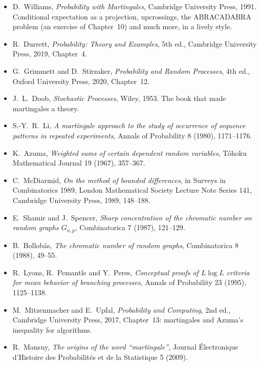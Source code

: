 \begin{itemize}
\item D.~Williams, \emph{Probability with Martingales}, Cambridge University Press, 1991. Conditional expectation as a
projection, upcrossings, the ABRACADABRA problem (an exercise of Chapter~10) and much more, in a lively style.
\item R.~Durrett, \emph{Probability: Theory and Examples}, 5th ed., Cambridge University Press, 2019, Chapter~4.
\item G.~Grimmett and D.~Stirzaker, \emph{Probability and Random Processes}, 4th ed., Oxford University Press, 2020,
Chapter~12.
\item J.~L.~Doob, \emph{Stochastic Processes}, Wiley, 1953. The book that made martingales a theory.
\item S.-Y.~R.~Li, \emph{A martingale approach to the study of occurrence of sequence patterns in repeated experiments},
Annals of Probability 8 (1980), 1171--1176.
\item K.~Azuma, \emph{Weighted sums of certain dependent random variables}, T\^ohoku Mathematical Journal 19 (1967),
357--367.
\item C.~McDiarmid, \emph{On the method of bounded differences}, in Surveys in Combinatorics 1989, London Mathematical
Society Lecture Note Series 141, Cambridge University Press, 1989, 148--188.
\item E.~Shamir and J.~Spencer, \emph{Sharp concentration of the chromatic number on random graphs $G_{n,p}$},
Combinatorica 7 (1987), 121--129.
\item B.~Bollob\'as, \emph{The chromatic number of random graphs}, Combinatorica 8 (1988), 49--55.
\item R.~Lyons, R.~Pemantle and Y.~Peres, \emph{Conceptual proofs of $L\log L$ criteria for mean behavior of branching
processes}, Annals of Probability 23 (1995), 1125--1138.
\item M.~Mitzenmacher and E.~Upfal, \emph{Probability and Computing}, 2nd ed., Cambridge University Press, 2017,
Chapter~13: martingales and Azuma's inequality for algorithms.
\item R.~Mansuy, \emph{The origins of the word ``martingale''}, Journal \'Electronique d'Histoire des Probabilit\'es et de la Statistique 5 (2009).
\end{itemize}
